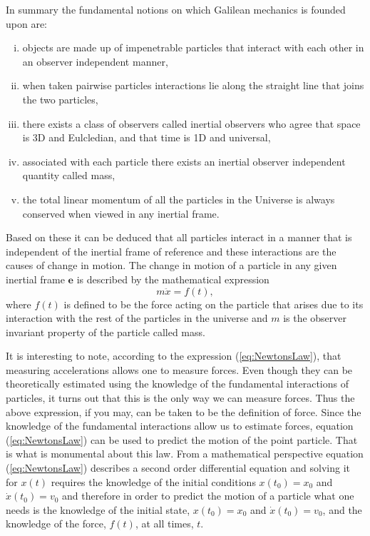 \documentclass[graybox,envcountchap,sectrefs]{svmonoMuga}
\begin{document}
 
\begin{svgraybox}
In summary the fundamental notions on which Galilean mechanics is founded upon are:
\begin{enumerate}[i.]
\item objects are made up of impenetrable particles that interact with each other in an observer independent manner,
\item when taken pairwise particles interactions lie along the straight line that joins the two particles,
\item there exists a class of observers called inertial observers who agree that space is 3D and Eulcledian, and that time is 1D and universal,
\item associated with each particle there exists an inertial observer independent quantity called mass,
\item the total linear momentum of all the particles in the Universe is always conserved when viewed in any inertial frame.
\end{enumerate}


Based on these it can be deduced that all particles interact in a manner that is independent of the inertial frame of reference and these interactions are the causes of change in motion. The change in motion of a particle in any given inertial frame $\mathbf{e}$ is described by the mathematical expression 
\begin{equation}\label{eq:NewtonsLaw}
m\ddot{x}=f(t),
\end{equation}
where $f(t)$ is defined to be the force acting on the particle that arises due to its interaction with the rest of the particles in the universe and $m$ is the observer invariant property of the particle called mass. \end{svgraybox}


It is interesting to note, according to the expression (\ref{eq:NewtonsLaw}), that measuring accelerations allows one to measure forces. Even though they can be theoretically estimated using the knowledge of 
the fundamental interactions of particles, it turns out that this is the only way we can measure forces. Thus the above expression, if you may, can be taken to be the definition of force.
Since the knowledge of the fundamental interactions allow us to estimate forces, equation (\ref{eq:NewtonsLaw}) can be used to predict the motion of the point particle. That is what 
is monumental about this law. From a mathematical perspective equation (\ref{eq:NewtonsLaw}) describes a second order differential equation and solving it for $x(t)$ requires the 
knowledge of the initial conditions $x(t_0)=x_0$ and $\dot{x}(t_0)=v_0$ and therefore in order to predict the motion of a particle what one needs is the knowledge of the initial state, 
$x(t_0)=x_0$ and $\dot{x}(t_0)=v_0$, and the knowledge of the force, $f(t)$, at all times, $t$.
\end{document}
